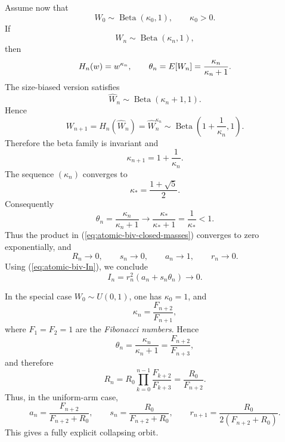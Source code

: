 \documentclass[onecolumn]{article}
\providecommand{\func}[1]{\operatorname{#1}}
\begin{document}
Assume now that 
\begin{equation*}
W_{0}\sim \func{Beta}(\kappa _{0},1),\qquad \kappa _{0}>0.
\end{equation*}%
If 
\begin{equation*}
W_{n}\sim \func{Beta}(\kappa _{n},1),
\end{equation*}%
then 
\begin{equation*}
H_{n}(w)=w^{\kappa _{n}},\qquad \theta _{n}=E[W_{n}]=\frac{\kappa _{n}}{%
\kappa _{n}+1}.
\end{equation*}%
The size-biased version satisfies 
\begin{equation*}
\widehat{W}_{n}\sim \func{Beta}(\kappa _{n}+1,1).
\end{equation*}%
Hence 
\begin{equation*}
W_{n+1}=H_{n}(\widehat{W}_{n})=\widehat{W}_{n}^{\kappa _{n}}\sim \func{Beta}%
\left( 1+\frac{1}{\kappa _{n}},1\right) .
\end{equation*}%
Therefore the beta family is invariant and 
\begin{equation}
\kappa _{n+1}=1+\frac{1}{\kappa _{n}}.  \label{eq:atomic-kappa-recursion}
\end{equation}%
The sequence $(\kappa _{n})$ converges to 
\begin{equation*}
\kappa _{\ast }=\frac{1+\sqrt{5}}{2}.
\end{equation*}%
Consequently 
\begin{equation*}
\theta _{n}=\frac{\kappa _{n}}{\kappa _{n}+1}\longrightarrow \frac{\kappa
_{\ast }}{\kappa _{\ast }+1}=\frac{1}{\kappa _{\ast }}<1.
\end{equation*}%
Thus the product in (\ref{eq:atomic-biv-closed-masses}) converges to zero
exponentially, and 
\begin{equation*}
R_{n}\rightarrow 0,\qquad s_{n}\rightarrow 0,\qquad a_{n}\rightarrow
1,\qquad r_{n}\rightarrow 0.
\end{equation*}%
Using (\ref{eq:atomic-biv-In}), we conclude 
\begin{equation}
I_{n}=r_{n}^{2}(a_{n}+s_{n}\theta _{n})\longrightarrow 0.
\label{eq:atomic-biv-In-collapse}
\end{equation}

In the special case $W_{0}\sim U(0,1)$, one has $\kappa _{0}=1$, and 
\begin{equation*}
\kappa _{n}=\frac{F_{n+2}}{F_{n+1}},
\end{equation*}%
where $F_{1}=F_{2}=1$ are the \textit{Fibonacci numbers}. Hence 
\begin{equation*}
\theta _{n}=\frac{\kappa _{n}}{\kappa _{n}+1}=\frac{F_{n+2}}{F_{n+3}},
\end{equation*}%
and therefore 
\begin{equation*}
R_{n}=R_{0}\prod_{k=0}^{n-1}\frac{F_{k+2}}{F_{k+3}}=\frac{R_{0}}{F_{n+2}}.
\end{equation*}%
Thus, in the uniform-arm case, 
\begin{equation}
a_{n}=\frac{F_{n+2}}{F_{n+2}+R_{0}},\qquad s_{n}=\frac{R_{0}}{F_{n+2}+R_{0}}%
,\qquad r_{n+1}=\frac{R_{0}}{2(F_{n+2}+R_{0})}.
\label{eq:atomic-uniform-closed-form}
\end{equation}%
This gives a fully explicit collapsing orbit.
\end{document}
